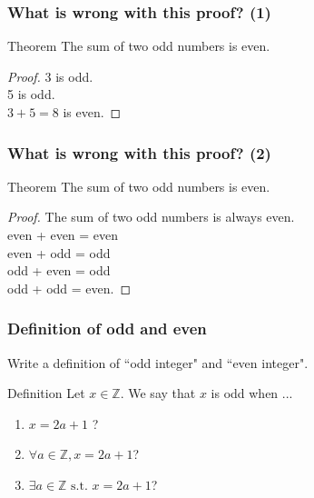 \documentclass[14pt]{beamer}
\begin{document}
\begin{frame}
	\frametitle{What is wrong with this proof? (1)}

	\begin{block}{Theorem}
		The sum of two odd numbers is even.
	\end{block}

	\vfill

	\begin{proof}
		3 is odd. \\ 5 is odd. \\ $3+5 = 8$ is even.
	\end{proof}

	\vfill
\end{frame}

\begin{frame}
	\frametitle{What is wrong with this proof? (2)}

	\begin{block}{Theorem}
		The sum of two odd numbers is even.
	\end{block}

	\vfill

	\begin{proof}
		The sum of two odd numbers is always even. \\ even + even = even \\ even +
		odd = odd \\ odd + even = odd \\ odd + odd = even.
	\end{proof}

	\vfill
\end{frame}

\begin{frame}
	\frametitle{Definition of odd and even}

	Write a definition of ``odd integer" and ``even integer".

	\vfill

	\begin{block}{Definition}
		Let $x \in \mathbb{Z}$. We say that $x$ is odd when ...
		\begin{enumerate}
			\item $x = 2a+1$ ?

			\item $\displaystyle \forall a \in \mathbb{Z}, x = 2a+ 1$?

			\item $\displaystyle \exists a \in \mathbb{Z}\text{ s.t. }x = 2a+ 1$?
		\end{enumerate}
	\end{block}

	\vfill
\end{frame}
\end{document}
